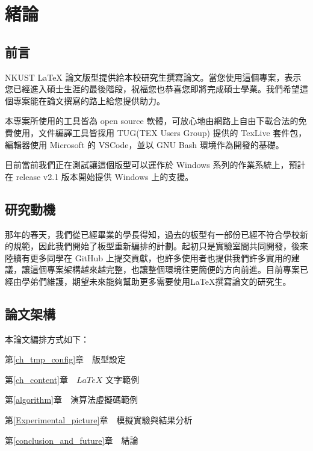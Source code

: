 
\chapter{緒論}\label{introduction}


\section{前言}\label{preface}

NKUST LaTeX 論文版型提供給本校研究生撰寫論文。當您使用這個專案，表示您已經進入碩士生涯的最後階段，祝福您也恭喜您即將完成碩士學業。我們希望這個專案能在論文撰寫的路上給您提供助力。

本專案所使用的工具皆為 open source 軟體，可放心地由網路上自由下載合法的免費使用，文件編譯工具皆採用 TUG(TEX Users Group) 提供的 TexLive 套件包，編輯器使用 Microsoft 的 VSCode，並以 GNU Bash 環境作為開發的基礎。

目前當前我們正在測試讓這個版型可以運作於 Windows 系列的作業系統上，預計在 release v2.1 版本開始提供 Windows 上的支援。

\newpage

\section{研究動機}\label{motive}

那年的春天，我們從已經畢業的學長得知，過去的板型有一部份已經不符合學校新的規範，因此我們開始了板型重新編排的計劃。起初只是實驗室間共同開發，後來陸續有更多同學在 GitHub 上提交貢獻，也許多使用者也提供我們許多實用的建議，讓這個專案架構越來越完整，也讓整個環境往更簡便的方向前進。目前專案已經由學弟們維護，期望未來能夠幫助更多需要使用LaTeX撰寫論文的研究生。


\newpage

\section{論文架構}\label{thesis_arch}
\n 本論文編排方式如下：

第\ref{ch_tmp_config}章　版型設定

第\ref{ch_content}章　$LaTeX$ 文字範例

第\ref{algorithm}章　演算法虛擬碼範例

第\ref{Experimental_picture}章　模擬實驗與結果分析

第\ref{conclusion_and_future}章　結論
